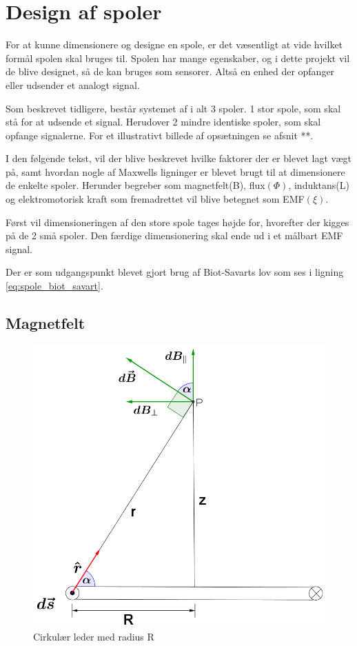 \section{Design af spoler}\label{sec:sec_spole_design}
For at kunne dimensionere og designe en spole, er det væsentligt at vide hvilket formål spolen skal bruges til. Spolen har mange egenskaber, og i dette projekt vil de blive designet, så de kan bruges som sensorer. Altså en enhed der opfanger eller udsender et analogt signal. 

Som beskrevet tidligere, består systemet af i alt 3 spoler. 1 stor spole, som skal stå for at udsende et signal. Herudover 2 mindre identiske spoler, som skal opfange signalerne. For et illustrativt billede af opsætningen se afsnit **.

I den følgende tekst, vil der blive beskrevet hvilke faktorer der er blevet lagt vægt på, samt hvordan nogle af Maxwells ligninger er blevet brugt til at dimensionere de enkelte spoler. Herunder begreber som magnetfelt(B), flux$(\Phi)$, induktans(L) og elektromotorisk kraft som fremadrettet vil blive betegnet som EMF$(\xi)$. 

Først vil dimensioneringen af den store spole tages højde for, hvorefter der kigges på de 2 små spoler.
Den færdige dimensionering skal ende ud i et målbart EMF signal.

Der er som udgangspunkt blevet gjort brug af Biot-Savarts lov som ses i ligning \ref{eq:spole_biot_savart}.
\subsection{Magnetfelt}
\begin{figure}[h!]
	\centering
	\includegraphics[width=.6\textwidth]{billeder/B_felt.png}
	\caption{Cirkulær leder med radius R}
	\label{fig:spole_fig1}
\end{figure}

